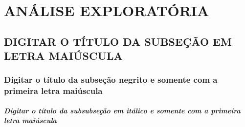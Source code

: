 \chapter{ANÁLISE EXPLORATÓRIA}\label{cap:ch4}  



\section{DIGITAR O TÍTULO DA SUBSEÇÃO EM LETRA MAIÚSCULA}\label{sec:ch4.1}



\subsection{\textbf{Digitar o título da subseção negrito e somente com a primeira letra maiúscula}}\label{subsec:ch4-1.1}



\subsubsection{\textit{Digitar o título da subsubseção em itálico e somente com a primeira letra maiúscula}}\label{subsubsec:ch4-1.1.1}

